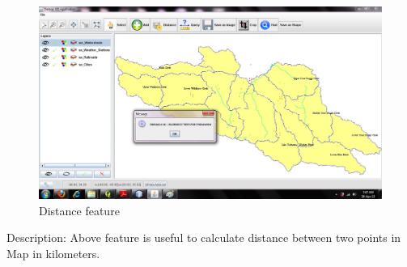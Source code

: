 \newpage
\begin{figure}[h]
\begin{center}
  \includegraphics[scale=0.43] {7.jpg}
  \caption[Screenshot - Distance]{Distance feature}
\end{center}
\end{figure}
Description: Above feature is useful to calculate distance between two points in Map in kilometers.

\newpage

